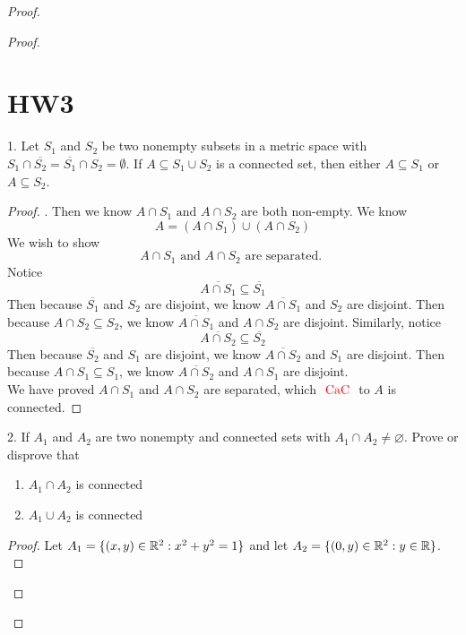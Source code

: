 \documentclass{report}
\begin{document}
\begin{proof}
\begin{proof}
\section{HW3}
\begin{question}{}{}
1. Let $S_1$ and $S_2$ be two nonempty subsets in a metric space with $S_1 \cap \overline{S_2} = \overline{S_1}\cap S_2 = \emptyset$. If $A \subseteq S_1 \cup S_2$ is a connected set, then either $A \subseteq S_1$ or $A \subseteq S_2$.
\end{question}
\begin{proof}
. Then we know $A\cap S_1\text{ and }A\cap S_2$ are both non-empty. We know
\begin{equation}
A=(A\cap S_1)\cup (A\cap S_2)
\end{equation}
We wish to show
 \begin{equation}
A\cap S_1\text{ and }A\cap S_2\text{ are separated. }
\end{equation}
Notice 
\begin{equation}
\overline{A\cap S_1}\subseteq \overline{S_1}
\end{equation}
Then because $\overline{S_1}$ and $S_2$ are disjoint, we know $\overline{A\cap S_1}$ and $S_2$ are disjoint. Then because $A\cap S_2\subseteq S_2$, we know $\overline{A\cap S_1}$ and $A\cap S_2$ are disjoint. Similarly, notice
\begin{equation}
\overline{A\cap S_2}\subseteq \overline{S_2}
\end{equation}
Then because $\overline{S_2}$ and $S_1$ are disjoint, we know $\overline{A\cap S_2}$ and $S_1$ are disjoint. Then because $A\cap S_1\subseteq S_1$, we know $\overline{A\cap S_2}$ and $A\cap S_1$ are disjoint.    \\

We have proved $A\cap S_1$ and $A\cap S_2$ are separated, which $\text{ \textcolor{red}{CaC} }$ to $A$ is connected.
\end{proof}
\begin{question}{}{}
2. If $A_1$ and $A_2$ are two nonempty and connected sets with $A_1\cap A_2\neq \varnothing$. Prove or disprove that
\begin{enumerate}[label=(\alph*)]
  \item $A_1\cap A_2$ is connected
  \item $A_1\cup A_2$ is connected
\end{enumerate}
\end{question}
\begin{proof}
Let $A_1=\{ (x,y)\in\mathbb{R}^2:x^2+y^2=1 \}$ and let  $A_2=\{ (0,y)\in\mathbb{R}^2:y\in\mathbb{R} \}$.\\


\end{proof}
\end{proof}
\end{proof}
\end{document}
